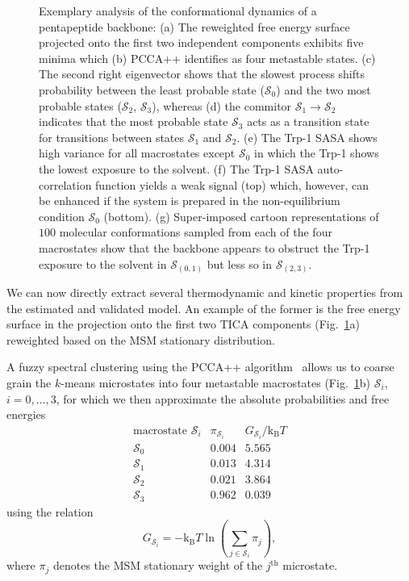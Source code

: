 \documentclass[9pt,tutorial]{livecoms}
\begin{document}
\begin{figure}
\caption{Exemplary analysis of the conformational dynamics of a pentapeptide backbone: (a) The reweighted free energy surface projected onto the first two independent components exhibits five minima which (b) PCCA++ identifies as four metastable states. (c) The second right eigenvector shows that the slowest process shifts probability between the least probable state ($\mathcal{S}_0$) and the two most probable states ($\mathcal{S}_2$, $\mathcal{S}_3$), whereas (d) the commitor $\mathcal{S}_1\to\mathcal{S}_2$ indicates that the most probable state $\mathcal{S}_3$ acts as a transition state for transitions between states $\mathcal{S}_1$ and $\mathcal{S}_2$. (e) The Trp-1 SASA shows high variance for all macrostates except $\mathcal{S}_0$ in which the Trp-1 shows the lowest exposure to the solvent. (f) The Trp-1 SASA auto-correlation function yields a weak signal (top) which, however, can be enhanced if the system is prepared in the non-equilibrium condition $\mathcal{S}_0$ (bottom). (g) Super-imposed cartoon representations of $100$ molecular conformations sampled from each of the four macrostates show that the backbone appears to obstruct the Trp-1 exposure to the solvent in $\mathcal{S}_{(0,1)}$ but less so in $\mathcal{S}_{(2,3)}$.}
\label{fig:msm-analysis}
\end{figure}

We can now directly extract several thermodynamic and kinetic properties from the estimated and validated model. An example of the former is the free energy surface in the projection onto the first two TICA components (Fig.~\ref{fig:msm-analysis}a) reweighted based on the MSM stationary distribution.

A fuzzy spectral clustering using the PCCA++ algorithm~\cite{pcca++} allows us to coarse grain the $k$-means microstates into four metastable macrostates (Fig.~\ref{fig:msm-analysis}b) $\mathcal{S}_i$, $i=0,\dots,3$, for which we then approximate the absolute probabilities and free energies
\[ \begin{array}{ccc}
\textrm{macrostate } \mathcal{S}_i & \pi_{\mathcal{S}_i} & G_{\mathcal{S}_i} / \textrm{k}_\textrm{B} T \\
\hline
\mathcal{S}_0 & 0.004 & 5.565 \\
\mathcal{S}_1 & 0.013 & 4.314 \\
\mathcal{S}_2 & 0.021 & 3.864 \\
\mathcal{S}_3 & 0.962 & 0.039
\end{array}\]
using the relation
\begin{equation}
\label{eq:fe}
G_{\mathcal{S}_i} = - \textrm{k}_\textrm{B} T \ln\left(\sum\limits_{j\in \mathcal{S}_i} \pi_j\right),
\end{equation}
where $\pi_j$ denotes the MSM stationary weight of the $j^\textrm{th}$ microstate.
\end{document}
